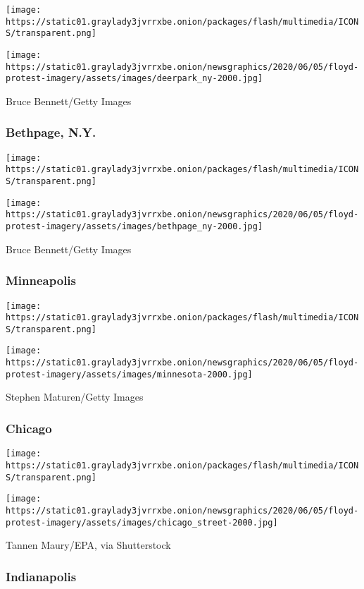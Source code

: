 \texttt{[image: https://static01.graylady3jvrrxbe.onion/packages/flash/multimedia/ICONS/transparent.png]}

\texttt{[image: https://static01.graylady3jvrrxbe.onion/newsgraphics/2020/06/05/floyd-protest-imagery/assets/images/deerpark\_ny-2000.jpg]}

Bruce Bennett/Getty Images

\hypertarget{bethpage-ny}{%
\subsubsection{Bethpage, N.Y.}\label{bethpage-ny}}

\texttt{[image: https://static01.graylady3jvrrxbe.onion/packages/flash/multimedia/ICONS/transparent.png]}

\texttt{[image: https://static01.graylady3jvrrxbe.onion/newsgraphics/2020/06/05/floyd-protest-imagery/assets/images/bethpage\_ny-2000.jpg]}

Bruce Bennett/Getty Images

\hypertarget{minneapolis}{%
\subsubsection{Minneapolis}\label{minneapolis}}

\texttt{[image: https://static01.graylady3jvrrxbe.onion/packages/flash/multimedia/ICONS/transparent.png]}

\texttt{[image: https://static01.graylady3jvrrxbe.onion/newsgraphics/2020/06/05/floyd-protest-imagery/assets/images/minnesota-2000.jpg]}

Stephen Maturen/Getty Images

\hypertarget{chicago}{%
\subsubsection{Chicago}\label{chicago}}

\texttt{[image: https://static01.graylady3jvrrxbe.onion/packages/flash/multimedia/ICONS/transparent.png]}

\texttt{[image: https://static01.graylady3jvrrxbe.onion/newsgraphics/2020/06/05/floyd-protest-imagery/assets/images/chicago\_street-2000.jpg]}

Tannen Maury/EPA, via Shutterstock

\hypertarget{indianapolis}{%
\subsubsection{Indianapolis}\label{indianapolis}}

